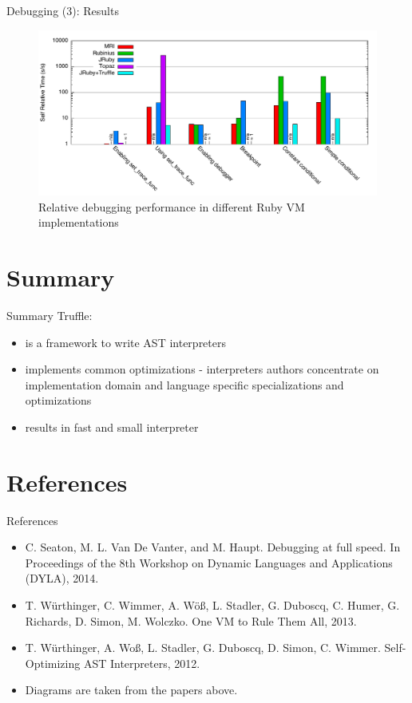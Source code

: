 \documentclass[xcolor=dvipsname]{beamer}
\begin{document}
\begin{frame}{Debugging (3): Results}
  \begin{figure}
    \includegraphics[width=\textwidth]{performance-debugging.pdf}
    \caption{Relative debugging performance in different Ruby VM implementations}
    \label{fig:debuggin_performance}
  \end{figure}
\end{frame}


\section{Summary}

\begin{frame}{Summary}
  Truffle:
  \begin{itemize}
    \item is a framework to write AST interpreters
    \item implements common optimizations - interpreters authors concentrate on implementation domain and language specific specializations and optimizations
    \item results in fast and small interpreter
  \end{itemize}
\end{frame}


\section{References}

\begin{frame}{References}
  \begin{itemize}
    \item C. Seaton, M. L. Van De Vanter, and M. Haupt. Debugging at full speed. In Proceedings of the 8th Workshop on Dynamic Languages and Applications (DYLA), 2014.
    \item T. Würthinger, C. Wimmer, A. Wöß, L. Stadler, G. Duboscq, C. Humer, G. Richards, D. Simon, M. Wolczko. One VM to Rule Them All, 2013.
    \item T. Würthinger, A. Woß, L. Stadler, G. Duboscq, D. Simon, C. Wimmer. Self-Optimizing AST Interpreters, 2012.

    \item Diagrams are taken from the papers above.
  \end{itemize}
\end{frame}
\end{document}
